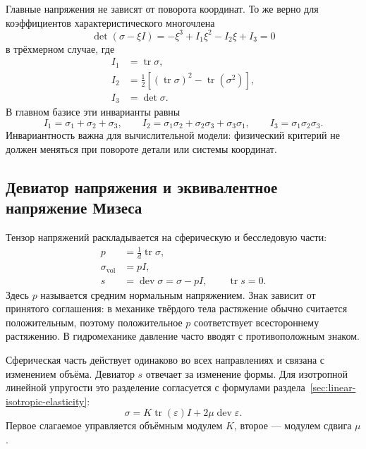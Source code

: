 Главные напряжения не зависят от поворота координат. То же верно для коэффициентов характеристического многочлена
\begin{equation}
\label{eq:stress-characteristic-polynomial-v05}
 \det(\sigma-\xi I)
 =-\xi^3+I_1\xi^2-I_2\xi+I_3=0
\end{equation}
в трёхмерном случае, где
\begin{align}
 I_1&=\operatorname{tr}\sigma,
 \label{eq:stress-first-invariant-v05}\\
 I_2&=\frac12\left[
 (\operatorname{tr}\sigma)^2-\operatorname{tr}(\sigma^2)
 \right],
 \label{eq:stress-second-invariant-v05}\\
 I_3&=\det\sigma.
 \label{eq:stress-third-invariant-v05}
\end{align}
В главном базисе эти инварианты равны
\[
 I_1=\sigma_1+\sigma_2+\sigma_3,
 \qquad
 I_2=\sigma_1\sigma_2+\sigma_2\sigma_3+\sigma_3\sigma_1,
 \qquad
 I_3=\sigma_1\sigma_2\sigma_3.
\]
Инвариантность важна для вычислительной модели: физический критерий не должен меняться при повороте детали или системы координат.

\subsection{Девиатор напряжения и эквивалентное напряжение Мизеса}

Тензор напряжений раскладывается на сферическую и бесследовую части:
\begin{align}
 p&=\frac1d\operatorname{tr}\sigma,
 \label{eq:mean-stress-v05}\\
 \sigma_{\mathrm{vol}}&=pI,
 \label{eq:volumetric-stress-v05}\\
 s&=\operatorname{dev}\sigma
 =\sigma-pI,
 \qquad
 \operatorname{tr}s=0.
 \label{eq:deviatoric-stress-v05}
\end{align}
Здесь $p$ называется средним нормальным напряжением. Знак зависит от принятого соглашения: в механике твёрдого тела растяжение обычно считается положительным, поэтому положительное $p$ соответствует всестороннему растяжению. В гидромеханике давление часто вводят с противоположным знаком.

Сферическая часть действует одинаково во всех направлениях и связана с изменением объёма. Девиатор $s$ отвечает за изменение формы. Для изотропной линейной упругости это разделение согласуется с формулами раздела~\ref{sec:linear-isotropic-elasticity}:
\begin{equation}
\label{eq:stress-strain-vol-dev-v05}
 \sigma
 =K\operatorname{tr}(\varepsilon)I
 +2\mu\operatorname{dev}\varepsilon.
\end{equation}
Первое слагаемое управляется объёмным модулем $K$, второе --- модулем сдвига $\mu$.

